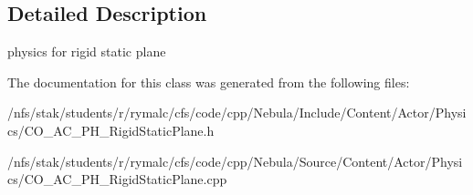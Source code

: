 \subsection{Detailed Description}
physics for rigid static plane 

The documentation for this class was generated from the following files:\begin{DoxyCompactItemize}
\item 
/nfs/stak/students/r/rymalc/cfs/code/cpp/Nebula/Include/Content/Actor/Physics/CO\_\-AC\_\-PH\_\-RigidStaticPlane.h\item 
/nfs/stak/students/r/rymalc/cfs/code/cpp/Nebula/Source/Content/Actor/Physics/CO\_\-AC\_\-PH\_\-RigidStaticPlane.cpp\end{DoxyCompactItemize}
